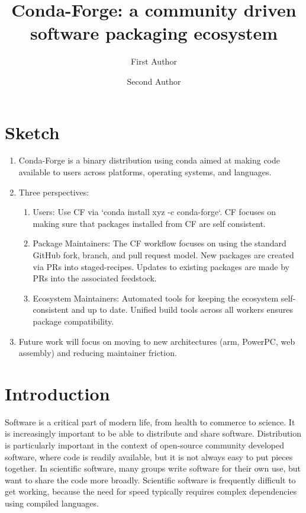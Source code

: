 \documentclass[fleqn,10pt,lineno]{wlpeerj} %
\title{Conda-Forge: a community driven software packaging ecosystem}
\author[1]{First Author}
\author[2]{Second Author}
\affil[1]{Address of first author}
\affil[2]{Address of second author}
\begin{document}
\flushbottom
\maketitle
\thispagestyle{empty}


\section*{Sketch}
\begin{enumerate}
\item Conda-Forge is a binary distribution using conda aimed at making code
  available to users across platforms, operating systems, and languages.
\item Three perspectives:
\begin{enumerate}
\item Users: Use CF via `conda install xyz -c conda-forge`. CF focuses on making
  sure that packages installed from CF are self consistent.
\item Package Maintainers: The CF workflow focuses on using the standard GitHub
  fork, branch, and pull request model. New packages are created via PRs into
  staged-recipes. Updates to existing packages are made by PRs into the
  associated feedstock.
\item Ecosystem Maintainers: Automated tools for keeping the ecosystem
  self-consistent and up to date. Unified build tools across all workers ensures
  package compatibility.
\end{enumerate}
\item Future work will focus on moving to new architectures (arm, PowerPC,
web assembly) and reducing maintainer friction.
\end{enumerate}


\section*{Introduction}
Software is a critical part of modern life, from health to commerce to science.
It is increasingly important to be able to distribute and share software.
Distribution is particularly important in the context of open-source community
developed software, where code is readily available, but it is not always easy
to put pieces together. In scientific software, many groups write software for
their own use, but want to share the code more broadly. Scientific software is
frequently difficult to get working, because the need for speed typically
requires complex dependencies using compiled languages.
\end{document}
